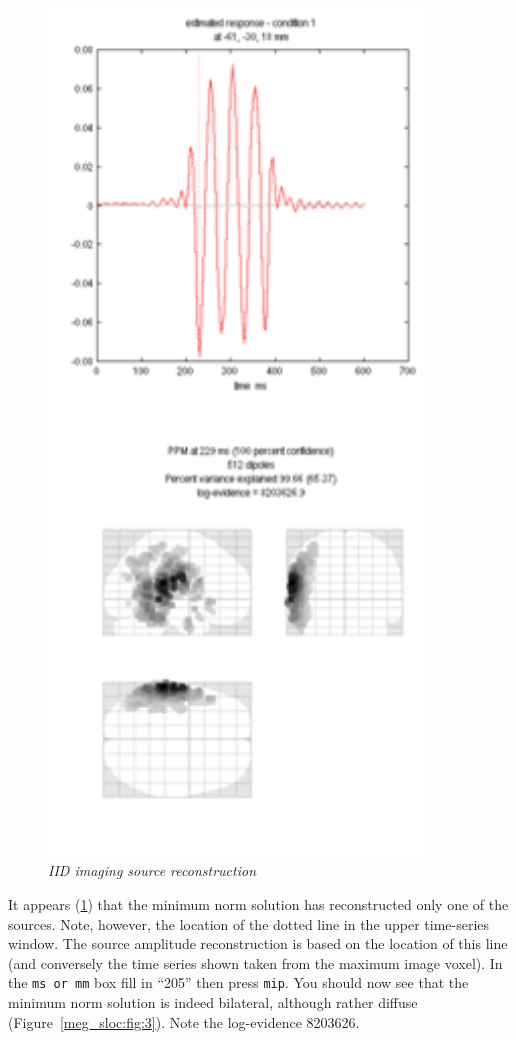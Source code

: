 \begin{figure}
\begin{center}
\includegraphics[width=100mm]{meg_sloc/slide2}
\caption{\em IID imaging source reconstruction \label{meg_sloc:fig:2}}
\end{center}
\end{figure}

 
It appears (\ref{meg_sloc:fig:2}) that the minimum norm solution has reconstructed only one of the sources. Note, however, the location of the dotted line in the upper time-series window. The source amplitude reconstruction is based on the location of this line (and conversely the time series shown taken from the maximum image voxel). In the \texttt{ms or mm} box fill in ``205'' then press \texttt{mip}. You should now see that the minimum norm solution is indeed bilateral, although rather diffuse (Figure~\ref{meg_sloc:fig:3}).  Note the log-evidence 8203626.


